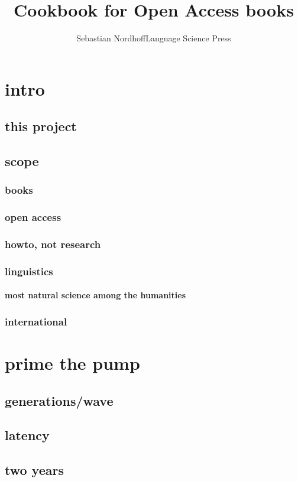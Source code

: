 \documentclass[output=guidelines,guidelines] {langscibook}
\title{Cookbook for Open Access books}
\author{Sebastian Nordhoff\newlineCover Language Science Press}
\begin{document}
\maketitle
\frontmatter 
\tableofcontents 
\mainmatter
\chapter{intro}
\section{this project}
\section{scope}
\subsection{books}
\subsection{open access}
\subsection{howto, not research}
\subsection{linguistics}
\subsubsection{most natural science among the humanities}
\subsection{international}
\chapter{prime the pump}
\section{generations/wave}
\section{latency}
\section{two years}
\end{document}
